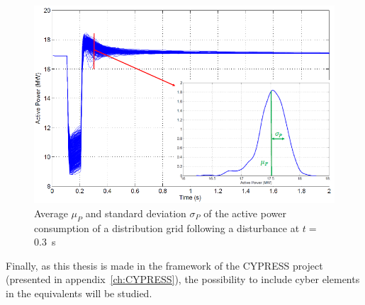 
\begin{figure}
    \centering
    \includegraphics[width=0.6\linewidth]{Figs/GreyBoxUncertainty.png}
    \caption{Average \(\mu_P\) and standard deviation \(\sigma_P\) of the active power consumption of a distribution grid following a disturbance at \(t=\)0.3~s~\cite[p58]{ChaspierreThesis}}
    \label{fig:greyBoxUncertainty}
\end{figure}


Finally, as this thesis is made in the framework of the CYPRESS project (presented in appendix~\ref{ch:CYPRESS}), the possibility to include cyber elements in the equivalents will be studied.




